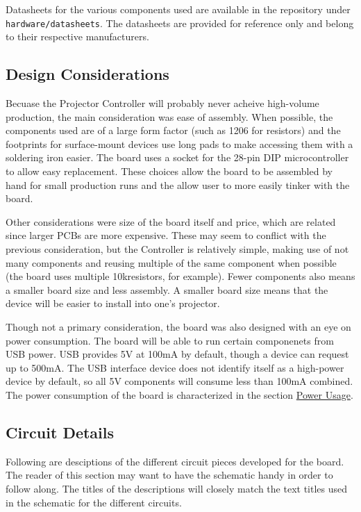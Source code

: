 \documentclass{article}
\begin{document}
Datasheets for the various components used are available in the repository under
\texttt{hardware/datasheets}.  The datasheets are provided for reference only and belong to their
respective manufacturers.

\subsection{Design Considerations} \label{DesignConsid_ssec}
Becuase the Projector Controller will probably never acheive high-volume production, the main
consideration was ease of assembly.  When possible, the components used are of a large form factor
(such as 1206 for resistors) and the footprints for surface-mount devices use long pads to make
accessing them with a soldering iron easier.  The board uses a socket for the 28-pin DIP
microcontroller to allow easy replacement.  These choices allow the board to be assembled by hand
for small production runs and the allow user to more easily tinker with the board.

Other considerations were size of the board itself and price, which are related since larger PCBs
are more expensive.  These may seem to conflict with the previous consideration, but the Controller
is relatively simple, making use of not many components and reusing multiple of the same component
when possible (the board uses multiple 10k\Omega resistors, for example).  Fewer components also
means a smaller board size and less assembly.  A smaller board size means that the device will be
easier to install into one's projector.

Though not a primary consideration, the board was also designed with an eye on power consumption.
The board will be able to run certain componenets from USB power.  USB provides 5V at 100mA by
default, though a device can request up to 500mA.  The USB interface device does not identify itself
as a high-power device by default, so all 5V components will consume less than 100mA combined.  The
power consumption of the board is characterized in the section \hyperref[PowerUsage_ssec]{Power
 Usage}.

\subsection{Circuit Details} \label{CircuitDetails_ssec}
Following are desciptions of the different circuit pieces developed for the board.  The reader of
this section may want to have the schematic handy in order to follow along.  The titles of the
descriptions will closely match the text titles used in the schematic for the different circuits.
\end{document}
